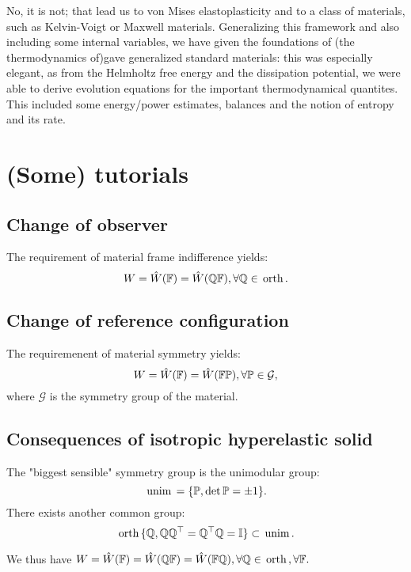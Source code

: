 \documentclass[reqno, a4paper]{article}
\begin{document}
No, it is not; that lead us to von Mises elastoplasticity and to a class of materials, such as Kelvin-Voigt or Maxwell materials. Generalizing this framework and also including some internal variables, we have given the foundations of (the thermodynamics of)gave generalized standard materials: this was especially elegant, as from the Helmholtz free energy and the dissipation potential, we were able to derive evolution equations for the important thermodynamical quantites. This included some energy/power estimates, balances and the notion of entropy and its rate. 

\section{(Some) tutorials}
\label{sec:tutorials}

\subsection{Change of observer}
\label{sec:chobserver}

The requirement of material frame indifference yields:
\[
	W = \hat{W}\qty(\mathbb{F}) = \hat{W}\qty(\mathbb{Q}\mathbb{F}), \forall \mathbb{Q} \in \, \text{orth} \,.
\]

\subsection{Change of reference configuration}
\label{sec:chreference}
The requiremenent of material symmetry yields:
\[
	W= \hat{W}\qty(\mathbb{F})= \hat{W}\qty(\mathbb{F} \mathbb{P}), \forall \mathbb{P} \in \mathcal{G},
\]
where $\mathcal{G}$ is the symmetry group of the material.

\subsection{Consequences of isotropic hyperelastic solid}
\label{sec:conshypelisosolid}

\begin{remark}
	The "biggest sensible" symmetry group is the unimodular group:
	\[
		\, \text{unim} \, = \{\mathbb{P}, \det \mathbb{P} = \pm 1\}.
	\]
	There exists another common group:
	\[
		\, \text{orth} \, \{ \mathbb{Q}, \mathbb{Q}\mathbb{Q}^\top = \mathbb{Q}^\top \mathbb{Q} = \mathbb{I}\} \subset \, \text{unim} \,.
	\]
\end{remark}
We thus have $W = \hat{W}\qty(\mathbb{F}) = \hat{W}\qty(\mathbb{Q}\mathbb{F}) = \hat{W}\qty(\mathbb{F} \mathbb{Q}), \forall \mathbb{Q} \in \, \text{orth} \,, \forall \mathbb{F}.$
\end{document}
